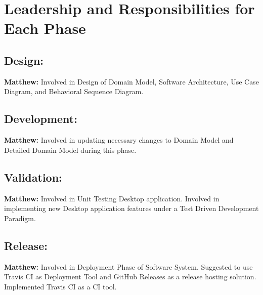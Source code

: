 \documentclass[12pt]{article}
\begin{document}
\section{Leadership and Responsibilities for Each Phase}
\subsection{Design:}
\textbf{Matthew:} Involved in Design of Domain Model, Software Architecture, Use Case Diagram, and Behavioral Sequence Diagram. \\

\subsection{Development:}
\textbf{Matthew:} Involved in updating necessary changes to Domain Model and Detailed Domain Model during this phase.


\subsection{Validation:}
\textbf{Matthew:} Involved in Unit Testing Desktop application. Involved in implementing new Desktop application features under a Test Driven Development Paradigm.

\subsection{Release:}
\textbf{Matthew:} Involved in Deployment Phase of Software System. Suggested to use Travis CI as Deployment Tool and GitHub Releases as a release hosting solution. Implemented Travis CI as a CI tool.
\end{document}
